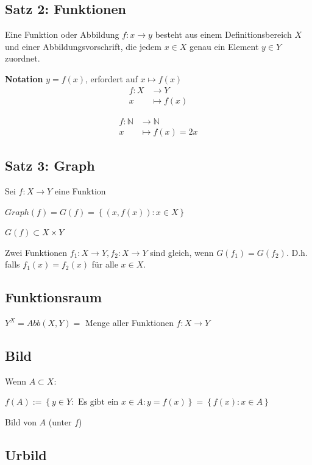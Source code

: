 \documentclass[fleqn]{scrbook}
\newcommand{\N}{\mathbb{N}}
\newenvironment{example}{{\bfseries Beispiel }}{}
\begin{document}
\subsection{Satz 2: Funktionen}

Eine Funktion oder Abbildung $f : x \to y$ besteht aus einem Definitionsbereich $X$ und einer Abbildungsvorschrift, die jedem $x \in X$ genau ein Element $y \in Y$ zuordnet.

\textbf{Notation} $y=f(x)$, erfordert auf $x \mapsto f(x)$
\begin{align*}
  f : X &\to Y\\
  x &\mapsto f(x)
\end{align*}

\begin{example}
\begin{align*}
  f : \N &\to \N\\
  x &\mapsto f(x) = 2x
\end{align*}
\end{example}

\subsection{Satz 3: Graph}

Sei $f:X \to Y$ eine Funktion

$Graph(f) = G(f) = \left\{ (x,f(x)) : x \in X \right\}$

$G(f) \subset X \times Y$

Zwei Funktionen $f_1 : X \to Y, f_2 : X \to Y$ sind gleich, wenn $G(f_1) = G(f_2)$. D.h. falls $f_1(x)=f_2(x)$ für alle $x \in X$.

\subsection{Funktionsraum}

$Y^X = Abb(X,Y) = $ Menge aller Funktionen $f : X \to Y$

\subsection{Bild}

Wenn $A \subset X$:

$f(A):=\left\{ y \in Y : \text{ Es gibt ein } x \in A : y=f(x) 
\right\} =\left\{ f(x) : x \in A \right\}$

Bild von $A$ (unter $f$)

\subsection{Urbild}
\end{document}
